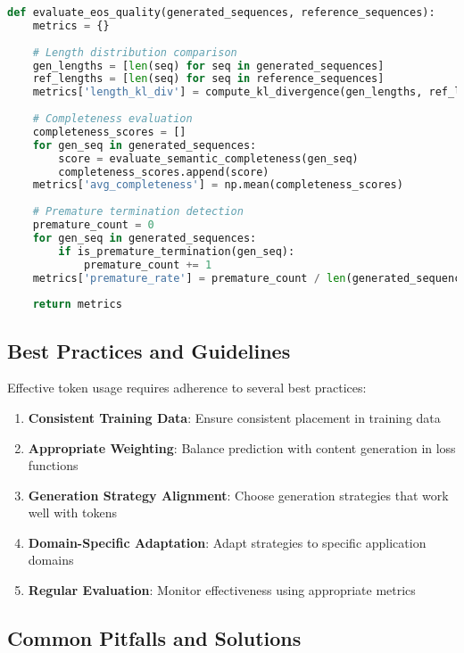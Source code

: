\begin{lstlisting}[language=Python, caption=EOS evaluation metrics]
def evaluate_eos_quality(generated_sequences, reference_sequences):
    metrics = {}
    
    # Length distribution comparison
    gen_lengths = [len(seq) for seq in generated_sequences]
    ref_lengths = [len(seq) for seq in reference_sequences]
    metrics['length_kl_div'] = compute_kl_divergence(gen_lengths, ref_lengths)
    
    # Completeness evaluation
    completeness_scores = []
    for gen_seq in generated_sequences:
        score = evaluate_semantic_completeness(gen_seq)
        completeness_scores.append(score)
    metrics['avg_completeness'] = np.mean(completeness_scores)
    
    # Premature termination detection
    premature_count = 0
    for gen_seq in generated_sequences:
        if is_premature_termination(gen_seq):
            premature_count += 1
    metrics['premature_rate'] = premature_count / len(generated_sequences)
    
    return metrics
\end{lstlisting}

\subsection{Best Practices and Guidelines}

Effective \eos{} token usage requires adherence to several best practices:

\begin{enumerate}
\item \textbf{Consistent Training Data}: Ensure consistent \eos{} placement in training data
\item \textbf{Appropriate Weighting}: Balance \eos{} prediction with content generation in loss functions
\item \textbf{Generation Strategy Alignment}: Choose generation strategies that work well with \eos{} tokens
\item \textbf{Domain-Specific Adaptation}: Adapt \eos{} strategies to specific application domains
\item \textbf{Regular Evaluation}: Monitor \eos{} effectiveness using appropriate metrics
\end{enumerate}

\subsection{Common Pitfalls and Solutions}

